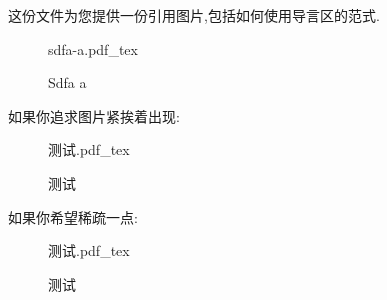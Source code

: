 \documentclass[AutoFakeBold,twoside]{article}
\newcommand{\incfig}[1]{%
    \def\svgwidth{\columnwidth}
    {#1.pdf_tex}
}
\begin{document}
这份文件为您提供一份引用图片,包括如何使用导言区的范式.
\begin{figure}[ht]
    \centering
    \incfig{sdfa-a}
    \caption{Sdfa a}
    \label{fig:sdfa-a}
\end{figure}
如果你追求图片紧挨着出现:
\begin{figure}[H]
    \centering
    \incfig{测试}
    \caption{测试}
    \label{fig:测试}
\end{figure}

如果你希望稀疏一点:
\begin{figure}[ht]
    \centering
    \incfig{测试}
    \caption{测试}
    \label{fig:测试}
\end{figure}
\end{document}
